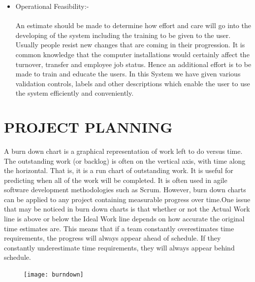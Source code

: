 \documentclass[a4paper, 12pt]{report}
\begin{document}
\begin{itemize}
\paragraph{}
\item Operational Feasibility:-
\paragraph{}An estimate should be made to determine how effort and care will go into the
developing of the system including the training to be given to the user. Usually people resist
new changes that are coming in their progression. It is common knowledge that the computer
installations would certainly affect the turnover, transfer and employee job status. Hence an
additional effort is to be made to train and educate the users. In this System we
have given various validation controls, labels and other descriptions which enable the user to
use the system efficiently and conveniently.
\paragraph{}
\end{itemize}
\section{PROJECT PLANNING }
\paragraph{}A burn down chart is a graphical representation of work left to do versus time. The outstanding work (or backlog) is often on the vertical axis, with time along the horizontal. That is, it is a run chart of outstanding work. It is useful for predicting when all of the work will be completed. It is often used in agile software development methodologies such as Scrum. However, burn down charts can be applied to any project containing measurable progress over time.One issue that may be noticed in burn down charts is that whether or not the Actual Work line is above or below the Ideal Work line depends on how accurate the original time estimates are. This means that if a team constantly overestimates time requirements, the progress will always appear ahead of schedule. If they constantly underestimate time requirements, they will always appear behind schedule.
\begin{figure}
	\centering
	\texttt{[image: burndown]}
	\label{}
\end{figure}
\end{document}
